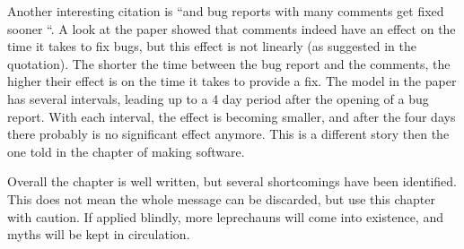 Another interesting citation is ``and bug reports with many comments get fixed sooner \cite{Hooimeijer:2007:MBR:1321631.1321639}``.
A look at the paper showed that comments indeed have an effect on the time it takes to fix bugs, but this effect is not linearly (as suggested in the quotation).
The shorter the time between the bug report and the comments, the higher their effect is on the time it takes to provide a fix. 
The model in the paper has several intervals, leading up to a 4 day period after the opening of a bug report. 
With each interval, the effect is becoming smaller, and after the four days there probably is no significant effect anymore.
This is a different story then the one told in the chapter of making software.

Overall the chapter is well written, but several shortcomings have been identified. 
This does not mean the whole message can be discarded, but use this chapter with caution.
If applied blindly, more leprechauns will come into existence, and myths will be kept in circulation.
